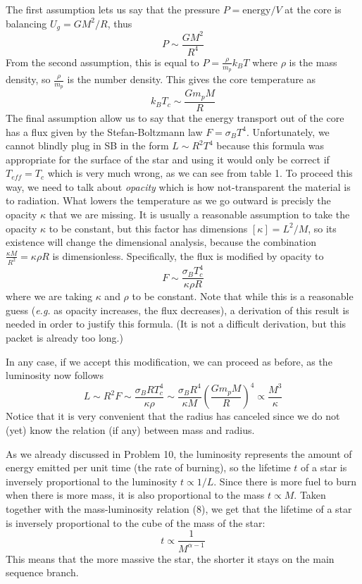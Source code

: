 \documentclass[11pt]{article}
\begin{document}
The first assumption lets us say that the pressure
\(P=\textrm{energy}/V\) at the core is balancing \(U_g=GM^2/R\), thus \[
P\sim \frac{GM^2}{R^4}
\] From the second assumption, this is equal to
\(P=\frac{\rho}{m_p} k_BT\) where \(\rho\) is the mass density, so
\(\frac{\rho}{m_p}\) is the number density. This gives the core
temperature as \[
k_B T_c\sim \frac{Gm_p M}{R}
\] The final assumption allow us to say that the energy transport out of
the core has a flux given by the Stefan-Boltzmann law
\(F=\sigma_B T^4\). Unfortunately, we cannot blindly plug in SB in the
form \(L\sim R^2 T^4\) because this formula was appropriate for the
surface of the star and using it would only be correct if
\(T_{eff}=T_c\) which is very much wrong, as we can see from table 1. To
proceed this way, we need to talk about \emph{opacity} which is how
not-transparent the material is to radiation. What lowers the
temperature as we go outward is precisly the opacity \(\kappa\) that we
are missing. It is usually a reasonable assumption to take the opacity
\(\kappa\) to be constant, but this factor has dimensions
\([\kappa]=L^2/M\), so its existence will change the dimensional
analysis, because the combination \(\frac{\kappa M}{R^2}=\kappa \rho R\)
is dimensionless. Specifically, the flux is modified by opacity to \[
F\sim \frac{\sigma_B T_c^4}{\kappa \rho R}
\] where we are taking \(\kappa\) and \(\rho\) to be constant. Note that
while this is a reasonable guess (\emph{e.g.} as opacity increases, the
flux decreases), a derivation of this result is needed in order to
justify this formula. (It is not a difficult derivation, but this packet
is already too long.)

In any case, if we accept this modification, we can proceed as before,
as the luminosity now follows \[
L \sim R^2F\sim \frac{\sigma_B R T_c^4}{\kappa \rho} \sim \frac{\sigma_B R^4}{\kappa M}\left(\frac{Gm_p M}{R}\right)^4 \propto \frac{M^3}{\kappa}
\] Notice that it is very convenient that the radius has canceled since
we do not (yet) know the relation (if any) between mass and radius.

As we already discussed in Problem 10, the luminosity represents the
amount of energy emitted per unit time (the rate of burning), so the
lifetime \(t\) of a star is inversely proportional to the luminosity
\(t\propto 1/L\). Since there is more fuel to burn when there is more
mass, it is also proportional to the mass \(t\propto M\). Taken together
with the mass-luminosity relation (8), we get that the lifetime of a
star is inversely proportional to the cube of the mass of the star: \[
                t\propto \frac1{M^{\alpha -1}}  \tag{8}
\] This means that the more massive the star, the shorter it stays on
the main sequence branch.
\end{document}
